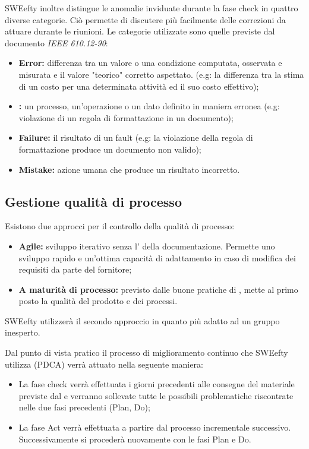 	SWEefty inoltre distingue le anomalie inviduate durante la fase check in quattro diverse categorie. Ciò permette di discutere più facilmente delle correzioni da attuare durante le riunioni. Le categorie utilizzate sono quelle previste dal documento \emph{IEEE 610.12-90}:

	\begin{itemize}
	\item \textbf{Error:} differenza tra un valore o una condizione computata, osservata e misurata e il valore "teorico" corretto aspettato. (e.g: la differenza tra la stima di un costo per una determinata attività ed il suo costo effettivo);

\item \textbf{:} un processo, un'operazione o un dato definito in maniera erronea (e.g: violazione di un regola di formattazione in un documento);

	\item \textbf{Failure:} il risultato di un fault (e.g: la violazione della regola di formattazione produce un documento non valido);

	\item \textbf{Mistake:} azione umana che produce un risultato incorretto.
	\end{itemize}

	\subsection{Gestione qualità di processo}
Esistono due approcci per il controllo della qualità di processo:
\begin{itemize}
	\item \textbf{Agile:} sviluppo iterativo senza l' della documentazione. Permette uno sviluppo rapido e un'ottima capacità di adattamento in caso di modifica dei requisiti da parte del fornitore;
	
	\item \textbf{A maturità di processo:} previsto dalle buone pratiche di , mette al primo posto la qualità del prodotto e dei processi.
\end{itemize}
	SWEefty utilizzerà il secondo approccio in quanto più adatto ad un gruppo inesperto.
	
Dal punto di vista pratico il processo di miglioramento continuo che SWEefty utilizza (PDCA) verrà attuato nella seguente maniera:
\begin{itemize}
	\item La fase check verrà effettuata i giorni precedenti alle consegne del materiale previste dal  e verranno sollevate tutte le possibili problematiche riscontrate nelle due fasi precedenti (Plan, Do);
	\item La fase Act verrà effettuata a partire dal processo incrementale successivo. Successivamente si procederà nuovamente con le fasi Plan e Do.
\end{itemize}
	
